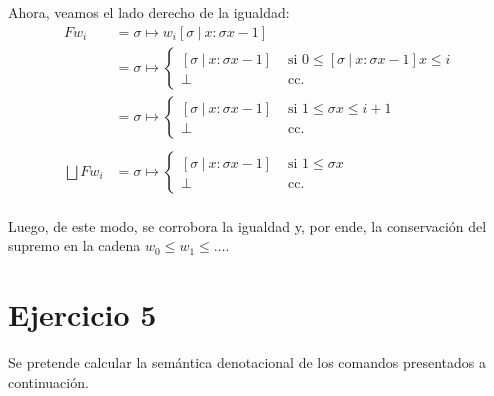 \documentclass{article}
\newcommand{\supr}{\bigsqcup\limits}
\begin{document}
Ahora, veamos el lado derecho de la igualdad:
\begin{equation*}
  \begin{aligned}
    F w_i &= \sigma \mapsto w_i[\sigma\ |\ x : \sigma x - 1] \\ 
          &= \sigma \mapsto \begin{cases}
            [\sigma\ |\ x : \sigma x - 1] &\text{ si }0 \leq [\sigma\ |\ x : \sigma x - 1] x \leq i \\ 
            \bot & \text{ cc. }
          \end{cases} \\ 
          &= \sigma \mapsto \begin{cases}
            [\sigma\ |\ x : \sigma x - 1] &\text{ si }1 \leq \sigma x \leq i + 1 \\ 
            \bot &\text{ cc. }
          \end{cases} \\
          \\ 
    \supr F w_i &= \sigma \mapsto \begin{cases}
      [\sigma\ |\ x : \sigma x - 1] &\text{ si }1 \leq \sigma x \\ 
      \bot &\text{ cc. }
    \end{cases} \\ 
  \end{aligned}
\end{equation*}

Luego, de este modo, se corrobora la igualdad y, por ende, la conservación del supremo en la cadena $w_0 \leq w_1 \leq \dots$.

\section*{Ejercicio 5}
Se pretende calcular la semántica denotacional de los comandos presentados a continuación.
\end{document}
